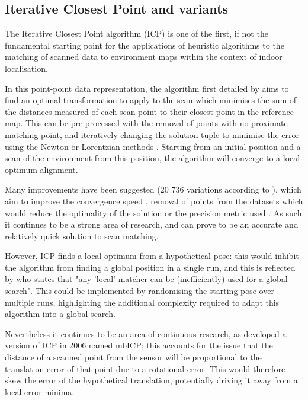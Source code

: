 \documentclass[authoryearcitations]{UoYCSproject}
\begin{document}
\subsection{Iterative Closest Point and variants}
\label{subsec:ICP}
The Iterative Closest Point algorithm (ICP) is one of the first, if not the fundamental starting point for the applications of heuristic algorithms to the matching of scanned data to environment maps within the context of indoor localisation.

In this point-point data representation, the algorithm first detailed by \citet{Besl1992-pd} aims to find an optimal transformation to apply to the scan which minimises the sum of the distances measured of each scan-point to their closest point in the reference map. This can be pre-processed with the removal of points with no proximate matching point, and iteratively changing the solution tuple to minimise the error using the Newton or Lorentzian methods \cite{Munoz2005-gt}. Starting from an initial position and a scan of the environment from this position, the algorithm will converge to a local optimum alignment. 

Many improvements have been suggested (20 736 variations according to \citet{Donoso2017-wp}), which aim to improve the convergence speed \cite{Donoso2017-wp} \cite{Simon1996-dl}, removal of points from the datasets which would reduce the optimality of the solution \cite{Weik1997-px} \cite{Masuda1996-av} or the precision metric used \cite{Eggert1997-ak}. As such it continues to be a strong area of research, and can prove to be an accurate and relatively quick solution to scan matching.

However, ICP finds a local optimum from a hypothetical pose: this would inhibit the algorithm from finding a global position in a single run, and this is reflected by \citet{Censi2005-iv} who states that "any 'local' matcher can be (inefficiently) used for a global search". This could be implemented by randomising the starting pose over multiple runs, highlighting the additional complexity required to adapt this algorithm into a global search.

Nevertheless it continues to be an area of continuous research, as \citet{Minguez2006-nj} developed a version of ICP in 2006 named mbICP;  this accounts for the issue that the distance of a scanned point from the sensor will be proportional to the translation error of that point due to a rotational error. This would therefore skew the error of the hypothetical translation, potentially driving it away from a local error minima.
\end{document}
